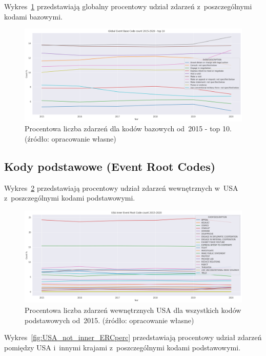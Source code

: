 \documentclass[11pt]{report}
\begin{document}
    Wykres~\ref{fig:GLOBAL_EBCperc} przedstawiają globalny procentowy udział zdarzeń z~poszczególnymi kodami bazowymi.

    \begin{figure}[tp]
        \centering
        \includegraphics[width=\linewidth]{fig/GLOBAL//EBCperc.png}
        \caption{Procentowa liczba zdarzeń dla kodów bazowych od~2015 - top 10. (źródło: opracowanie własne)}
        \label{fig:GLOBAL_EBCperc}
    \end{figure}

    \subsection{Kody podstawowe (Event Root Codes)}\label{subsec:kody-podstawowenullevent-root-codesnull2}

    Wykres~\ref{fig:USA_inner_ERCperc} przedstawiają procentowy udział zdarzeń wewnętrznych w~USA z~poszczególnymi kodami podstawowymi.

    \begin{figure}[tp]
        \centering
        \includegraphics[width=\linewidth]{fig/USA inner/ERCperc.png}
        \caption{Procentowa liczba zdarzeń wewnętrznych USA dla wszystkich kodów podstawowych od~2015. (źródło: opracowanie własne)}
        \label{fig:USA_inner_ERCperc}
    \end{figure}

    Wykres~\ref{fig:USA_not_inner_ERCperc} przedstawiają procentowy udział zdarzeń pomiędzy USA i~innymi krajami z~poszczególnymi kodami podstawowymi.
\end{document}
